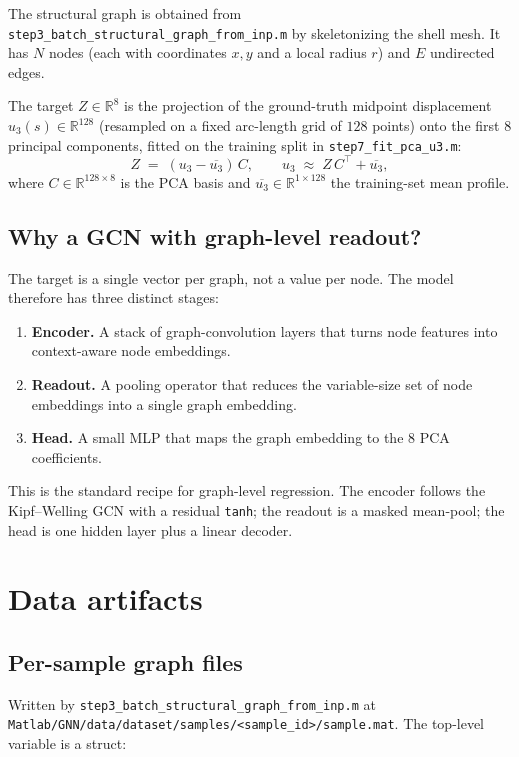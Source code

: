 \documentclass[11pt]{article}
\begin{document}
The structural graph is obtained from
\texttt{step3\_batch\_structural\_graph\_from\_inp.m} by skeletonizing the
shell mesh. It has $N$ nodes (each with coordinates $x,y$ and a local radius
$r$) and $E$ undirected edges.

The target $Z\in\mathbb{R}^{8}$ is the projection of the ground-truth midpoint
displacement $u_3(s)\in\mathbb{R}^{128}$ (resampled on a fixed arc-length grid
of $128$ points) onto the first $8$ principal components, fitted on the
training split in \texttt{step7\_fit\_pca\_u3.m}:
\[
  Z \;=\; (u_3 - \overline{u_3})\,C, \qquad
  u_3 \;\approx\; Z\,C^{\!\top} + \overline{u_3},
\]
where $C\in\mathbb{R}^{128\times 8}$ is the PCA basis and
$\overline{u_3}\in\mathbb{R}^{1\times128}$ the training-set mean profile.

\subsection{Why a GCN with graph-level readout?}

The target is a single vector per graph, not a value per node. The model
therefore has three distinct stages:

\begin{enumerate}[label=(\alph*)]
  \item \textbf{Encoder.} A stack of graph-convolution layers that turns
        node features into context-aware node embeddings.
  \item \textbf{Readout.} A pooling operator that reduces the variable-size
        set of node embeddings into a single graph embedding.
  \item \textbf{Head.} A small MLP that maps the graph embedding to the $8$
        PCA coefficients.
\end{enumerate}

This is the standard recipe for graph-level regression. The encoder follows
the Kipf--Welling GCN with a residual \texttt{tanh}; the readout is a masked
mean-pool; the head is one hidden layer plus a linear decoder.

\section{Data artifacts}

\subsection{Per-sample graph files}

Written by \texttt{step3\_batch\_structural\_graph\_from\_inp.m} at
\texttt{Matlab/GNN/data/dataset/samples/<sample\_id>/sample.mat}. The top-level
variable is a struct:
\end{document}
